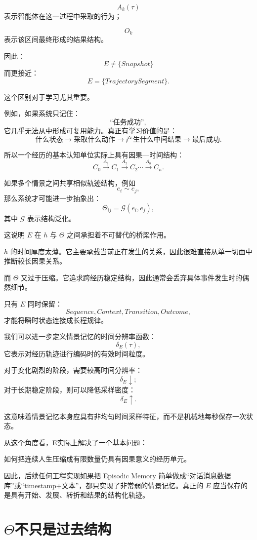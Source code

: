 \[
A_k(\tau)
\]
表示智能体在这一过程中采取的行为；

\[
O_k
\]
表示该区间最终形成的结果结构。

因此：
\[
\boxed{
E
\neq
\{Snapshot\}
}
\]
而更接近：
\[
\boxed{
E
=
\{TrajectorySegment\}.
}
\]

这个区别对于学习尤其重要。

例如，如果系统只记住：
\[
\text{“任务成功”},
\]
它几乎无法从中形成可复用能力。真正有学习价值的是：
\[
\text{什么状态}
\rightarrow
\text{采取什么动作}
\rightarrow
\text{产生什么中间结果}
\rightarrow
\text{最后成功}.
\]

所以一个经历的基本认知单位实际上具有因果—时间结构：
\[
C_0
\xrightarrow{A_1}
C_1
\xrightarrow{A_2}
C_2
\cdots
\xrightarrow{A_n}
C_n.
\]

如果多个情景之间共享相似轨迹结构，例如
\[
e_i\sim e_j,
\]
那么系统才可能进一步抽象出：
\[
\Theta_{ij}
=
\mathcal G(e_i,e_j),
\]
其中 \(\mathcal G\) 表示结构泛化。

这说明 \(E\) 在 \(h\) 与 \(\Theta\) 之间承担着不可替代的桥梁作用。

\(h\) 的时间厚度太薄。它主要承载当前正在发生的关系，因此很难直接从单一切面中推断较长因果关系。

而 \(\Theta\) 又过于压缩。它追求跨经历稳定结构，因此通常会丢弃具体事件发生时的偶然细节。

只有 \(E\) 同时保留：
\[
Sequence,
Context,
Transition,
Outcome,
\]
才能将瞬时状态连接成长程规律。

我们可以进一步定义情景记忆的时间分辨率函数：
\[
\delta_E(\tau),
\]
它表示对经历轨迹进行编码时的有效时间粒度。

对于变化剧烈的阶段，需要较高时间分辨率：
\[
\delta_E\downarrow;
\]
对于长期稳定阶段，则可以降低采样密度：
\[
\delta_E\uparrow.
\]

这意味着情景记忆本身应具有非均匀时间采样特征，而不是机械地每秒保存一次状态。

从这个角度看，E实际上解决了一个基本问题：

\begin{statementbox}
如何把连续人生压缩成有限数量仍具有因果意义的经历单元。
\end{statementbox}

因此，后续任何工程实现如果把 Episodic Memory 简单做成“对话消息数据库”或“timestamp+文本”，都只实现了非常弱的情景记忆。真正的 \(E\) 应当保存的是具有开始、发展、转折和结果的结构化轨迹。

\section{\texorpdfstring{$\Theta$}{Theta}不只是过去结构}

